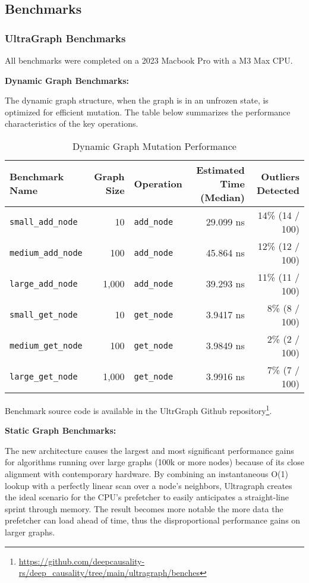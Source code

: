 \subsection{Benchmarks}
\label{sec:implementation_benchmarks}

\subsubsection{UltraGraph Benchmarks}

All benchmarks were completed on a 2023 Macbook Pro with a M3 Max CPU.

\textbf{Dynamic Graph Benchmarks:}

The dynamic graph structure, when the graph is in an unfrozen state, is optimized for efficient mutation. The table below summarizes the performance characteristics of the key operations.

\begin{table}[h!]
\centering
\caption{Dynamic Graph Mutation Performance}
\label{tab:dynamic-graph-perf}
\begin{tabular}{lrlrr}
\toprule
\textbf{Benchmark Name} & \textbf{Graph Size} & \textbf{Operation} & \textbf{Estimated Time (Median)} & \textbf{Outliers Detected} \\
\midrule
\texttt{small\_add\_node}  & 10    & \texttt{add\_node} & 29.099 ns & 14\% (14 / 100) \\
\texttt{medium\_add\_node} & 100   & \texttt{add\_node} & 45.864 ns & 12\% (12 / 100) \\
\texttt{large\_add\_node}  & 1,000 & \texttt{add\_node} & 39.293 ns & 11\% (11 / 100) \\
\texttt{small\_get\_node}  & 10    & \texttt{get\_node} & 3.9417 ns & 8\% (8 / 100)  \\
\texttt{medium\_get\_node} & 100   & \texttt{get\_node} & 3.9849 ns & 2\% (2 / 100)  \\
\texttt{large\_get\_node}  & 1,000 & \texttt{get\_node} & 3.9916 ns & 7\% (7 / 100)  \\
\bottomrule
\end{tabular}
\end{table}

Benchmark source code is available in the UltrGraph Github repository\footnote{\url{https://github.com/deepcausality-rs/deep_causality/tree/main/ultragraph/benches}}.


\textbf{Static Graph Benchmarks:}

The new architecture causes the largest and most significant performance gains for algorithms running over large graphs (100k or more nodes) because of its close alignment with contemporary hardware.
By combining an instantaneous O(1) lookup with a perfectly linear scan over a node's neighbors, Ultragraph creates the ideal scenario for the CPU's prefetcher to easily anticipates a straight-line sprint through memory. The result becomes more notable the more data the prefetcher can load ahead of time, thus the disproportional performance gains on larger graphs.

